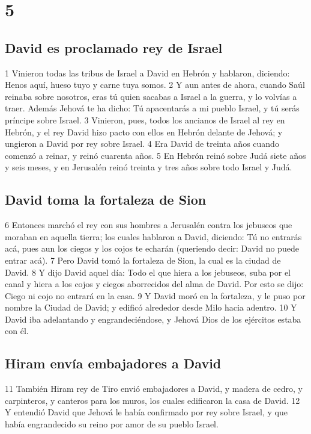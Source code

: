 \chapter{5}

\section*{David es proclamado rey de Israel}

 

1 Vinieron todas las tribus de Israel a David en Hebrón y hablaron, diciendo: Henos aquí, hueso tuyo y carne tuya somos.
2 Y aun antes de ahora, cuando Saúl reinaba sobre nosotros, eras tú quien sacabas a Israel a la guerra, y lo volvías a traer. Además Jehová te ha dicho: Tú apacentarás a mi pueblo Israel, y tú serás príncipe sobre Israel.
3 Vinieron, pues, todos los ancianos de Israel al rey en Hebrón, y el rey David hizo pacto con ellos en Hebrón delante de Jehová; y ungieron a David por rey sobre Israel.
4 Era David de treinta años cuando comenzó a reinar, y reinó cuarenta años.
5 En Hebrón reinó sobre Judá siete años y seis meses, y en Jerusalén reinó treinta y tres años sobre todo Israel y Judá. 
\section*{David toma la fortaleza de Sion}

 
6 Entonces marchó el rey con sus hombres a Jerusalén contra los jebuseos que moraban en aquella tierra; los cuales hablaron a David, diciendo: Tú no entrarás acá, pues aun los ciegos y los cojos te echarán (queriendo decir: David no puede entrar acá).
7 Pero David tomó la fortaleza de Sion, la cual es la ciudad de David.
8 Y dijo David aquel día: Todo el que hiera a los jebuseos, suba por el canal y hiera a los cojos y ciegos aborrecidos del alma de David. Por esto se dijo: Ciego ni cojo no entrará en la casa.
9 Y David moró en la fortaleza, y le puso por nombre la Ciudad de David; y edificó alrededor desde Milo hacia adentro.
10 Y David iba adelantando y engrandeciéndose, y Jehová Dios de los ejércitos estaba con él.
\section*{Hiram envía embajadores a David}

 
11 También Hiram rey de Tiro envió embajadores a David, y madera de cedro, y carpinteros, y canteros para los muros, los cuales edificaron la casa de David.
12 Y entendió David que Jehová le había confirmado por rey sobre Israel, y que había engrandecido su reino por amor de su pueblo Israel.
